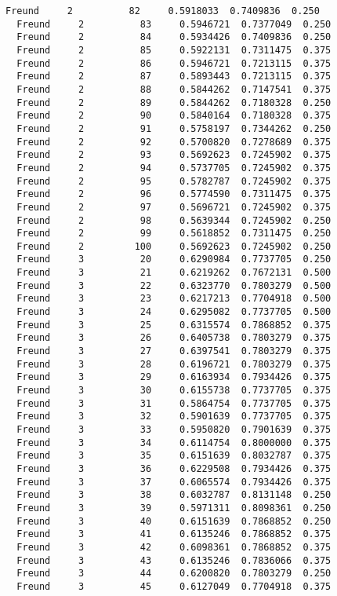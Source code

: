 \documentclass[11pt]{article}
\begin{document}
\begin{Verbatim}[commandchars=\\\{\}]
  Freund     2          82     0.5918033  0.7409836  0.250
  Freund     2          83     0.5946721  0.7377049  0.250
  Freund     2          84     0.5934426  0.7409836  0.250
  Freund     2          85     0.5922131  0.7311475  0.375
  Freund     2          86     0.5946721  0.7213115  0.375
  Freund     2          87     0.5893443  0.7213115  0.375
  Freund     2          88     0.5844262  0.7147541  0.375
  Freund     2          89     0.5844262  0.7180328  0.250
  Freund     2          90     0.5840164  0.7180328  0.375
  Freund     2          91     0.5758197  0.7344262  0.250
  Freund     2          92     0.5700820  0.7278689  0.375
  Freund     2          93     0.5692623  0.7245902  0.375
  Freund     2          94     0.5737705  0.7245902  0.375
  Freund     2          95     0.5782787  0.7245902  0.375
  Freund     2          96     0.5774590  0.7311475  0.375
  Freund     2          97     0.5696721  0.7245902  0.375
  Freund     2          98     0.5639344  0.7245902  0.250
  Freund     2          99     0.5618852  0.7311475  0.250
  Freund     2         100     0.5692623  0.7245902  0.250
  Freund     3          20     0.6290984  0.7737705  0.250
  Freund     3          21     0.6219262  0.7672131  0.500
  Freund     3          22     0.6323770  0.7803279  0.500
  Freund     3          23     0.6217213  0.7704918  0.500
  Freund     3          24     0.6295082  0.7737705  0.500
  Freund     3          25     0.6315574  0.7868852  0.375
  Freund     3          26     0.6405738  0.7803279  0.375
  Freund     3          27     0.6397541  0.7803279  0.375
  Freund     3          28     0.6196721  0.7803279  0.375
  Freund     3          29     0.6163934  0.7934426  0.375
  Freund     3          30     0.6155738  0.7737705  0.375
  Freund     3          31     0.5864754  0.7737705  0.375
  Freund     3          32     0.5901639  0.7737705  0.375
  Freund     3          33     0.5950820  0.7901639  0.375
  Freund     3          34     0.6114754  0.8000000  0.375
  Freund     3          35     0.6151639  0.8032787  0.375
  Freund     3          36     0.6229508  0.7934426  0.375
  Freund     3          37     0.6065574  0.7934426  0.375
  Freund     3          38     0.6032787  0.8131148  0.250
  Freund     3          39     0.5971311  0.8098361  0.250
  Freund     3          40     0.6151639  0.7868852  0.250
  Freund     3          41     0.6135246  0.7868852  0.375
  Freund     3          42     0.6098361  0.7868852  0.375
  Freund     3          43     0.6135246  0.7836066  0.375
  Freund     3          44     0.6200820  0.7803279  0.250
  Freund     3          45     0.6127049  0.7704918  0.375

\end{Verbatim}
\end{document}
